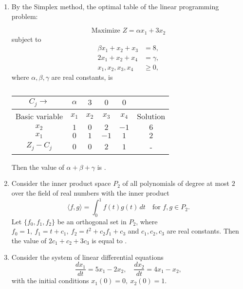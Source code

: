 \documentclass[journal,12pt,onecolumn]{IEEEtran}
\theoremstyle{remark}
\begin{document}
\begin{enumerate}[start=1, label=Q.\arabic*]
\item By the Simplex method, the optimal table of the linear programming problem:  

\[
\text{Maximize } Z = \alpha x_{1} + 3x_{2}
\]
subject to
\begin{align*}
\beta x_{1} + x_{2} + x_{3} &= 8,\\
2x_{1} + x_{2} + x_{4} &= \gamma,\\
x_{1},x_{2},x_{3},x_{4} &\ge 0,
\end{align*}
where $\alpha, \beta, \gamma$ are real constants, is

\begin{table}[H]
\centering
\begin{tabular}{|c|c|c|c|c|c|}
\hline
$C_j \to$ & $\alpha$ & $3$ & $0$ & $0$ & \\
\hline
Basic variable & $x_1$ & $x_2$ & $x_3$ & $x_4$ & Solution \\
\hline
$x_2$ & $1$ & $0$ & $2$ & $-1$ & $6$ \\
\hline
$x_1$ & $0$ & $1$ & $-1$ & $1$ & $2$ \\
\hline
$Z_j - C_j$ & $0$ & $0$ & $2$ & $1$ & - \\
\hline
\end{tabular}
\caption*{}
\label{tab:simplex}
\end{table}

Then the value of $\alpha+\beta+\gamma$ is \underline{\hspace{2cm}}.

\hfill{}



\item Consider the inner product space $P_{2}$ of all polynomials of degree at most $2$ over the field of real numbers with the inner product 
\[
\langle f,g\rangle = \int_{0}^{1} f(t)g(t)\, dt \quad \text{for } f,g \in P_{2}.
\]
Let $\{f_{0},f_{1},f_{2}\}$ be an orthogonal set in $P_{2}$, where $f_{0}=1,\ f_{1}=t+c_{1},\ f_{2}=t^{2}+c_{2}f_{1}+c_{3}$ and $c_{1},c_{2},c_{3}$ are real constants. Then the value of $2c_{1}+c_{2}+3c_{3}$ is equal to \underline{\hspace{2cm}}.

\hfill{}


\item Consider the system of linear differential equations
\[
\frac{dx_{1}}{dt}=5x_{1}-2x_{2}, \quad \frac{dx_{2}}{dt}=4x_{1}-x_{2},
\]
with the initial conditions $x_{1}(0)=0,\ x_{2}(0)=1$.  


\end{enumerate}
\end{document}
